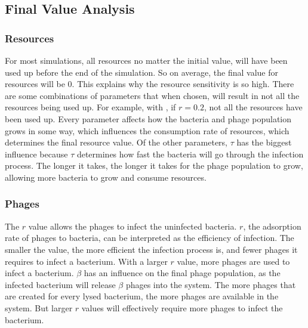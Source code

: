 \subsection{Final Value Analysis}
\subsubsection{Resources}
For most simulations, all resources no matter the initial value, will have been used up before the end of the simulation. 
So on average, the final value for resources will be 0. 
This explains why the resource sensitivity is so high. 
There are some combinations of parameters that when chosen, will result in not all the resources being used up. 
For example, with , if $r=0.2$, not all the resources have been used up. 
Every parameter affects how the bacteria and phage population grows in some way, which influences the consumption rate of resources, which determines the final resource value. 
Of the other parameters, $\tau$ has the biggest influence because $\tau$ determines how fast the bacteria will go through the infection process. 
The longer it takes, the longer it takes for the phage population to grow, allowing more bacteria to grow and consume resources. 

\subsubsection{Phages}
The $r$ value allows the phages to infect the uninfected bacteria. 
$r$, the adsorption rate of phages to bacteria, can be interpreted as the efficiency of infection. 
The smaller the value, the more efficient the infection process is, and fewer phages it requires to infect a bacterium. 
With a larger $r$ value, more phages are used to infect a bacterium. 
$\beta$ has an influence on the final phage population, as the infected bacterium will release $\beta$ phages into the system. 
The more phages that are created for every lysed bacterium, the more phages are available in the system. 
But larger $r$ values will effectively require more phages to infect the bacterium. 


